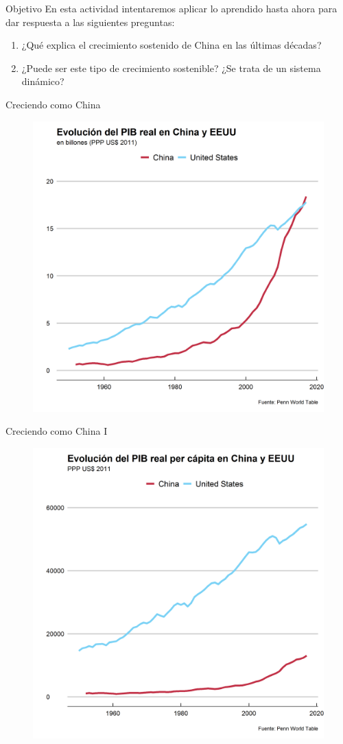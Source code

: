 \documentclass{beamer}
\begin{document}
	\begin{frame}{Objetivo}
		En esta actividad intentaremos aplicar lo aprendido hasta ahora para dar respuesta a las siguientes preguntas:
		\bigskip
		\begin{enumerate}
			\item ¿Qué explica el crecimiento sostenido de China en las últimas décadas?
			\medskip
			\item ¿Puede ser este tipo de crecimiento sostenible? ¿Se trata de un sistema dinámico?
		\end{enumerate}		
	\end{frame}

	\begin{frame}{Creciendo como China}
		\begin{figure}
			\centering
			\includegraphics[width=.7\linewidth, keepaspectratio]{pib_real}
		\end{figure}
	\end{frame}

	\begin{frame}{Creciendo como China I}
		\begin{figure}
			\centering
			\includegraphics[width=.7\linewidth, keepaspectratio]{pib_real_pc}
		\end{figure}
	\end{frame}
\end{document}
